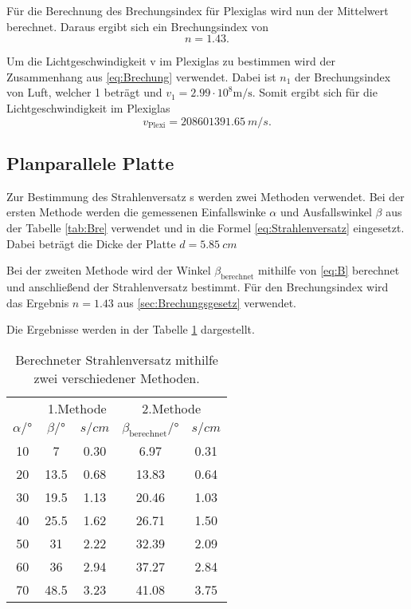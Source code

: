 \noindent Für die Berechnung des Brechungsindex für Plexiglas wird nun der Mittelwert berechnet.
Daraus ergibt sich ein Brechungsindex von
\begin{equation*}
  n = 1.43.
\end{equation*} 

\noindent Um die Lichtgeschwindigkeit v im Plexiglas zu bestimmen wird der Zusammenhang aus \ref{eq:Brechung} verwendet.
Dabei ist $n_1$ der Brechungsindex von Luft, welcher  1 beträgt und $v_1 = 2.99 \cdot 10^8 \si{\meter\per\second}$.
Somit ergibt sich für die Lichtgeschwindigkeit im Plexiglas 
\begin{equation*}
  v_\text{Plexi} = \qty{208601391.65}{m/s} .
\end{equation*}

\subsection{Planparallele Platte}
Zur Bestimmung des Strahlenversatz s werden zwei Methoden verwendet.
Bei der ersten Methode werden die gemessenen Einfallswinke $\alpha$ und Ausfallswinkel $\beta$ aus der Tabelle \ref{tab:Bre} verwendet und 
in die Formel \ref{eq:Strahlenversatz} eingesetzt.
Dabei beträgt die Dicke der Platte $d = \qty{5.85}{cm}$

\noindent Bei der zweiten Methode wird der Winkel $\beta_\text{berechnet}$ mithilfe von \ref{eq:B} berechnet und anschließend der Strahlenversatz bestimmt.
Für den Brechungsindex wird das Ergebnis $n = 1.43$ aus \ref{sec:Brechungsgesetz} verwendet.

\noindent Die Ergebnisse werden in der Tabelle \ref{tab:Plan} dargestellt.
\begin{table}[H]
  \centering
  \caption{Berechneter Strahlenversatz mithilfe zwei verschiedener Methoden.}
  \label{tab:Plan}
  \begin{tabular}{c c c c c}
    \toprule
  & \multicolumn{2}{c}{1.Methode} & \multicolumn{2}{c}{2.Methode} \\
\cmidrule(lr){2-3}\cmidrule(lr){4-5}
    $\alpha / °$ & $\beta  /° $ & $s /cm$ &  $\beta_\text{berechnet}  /°$ & $s /cm$ \\
    \midrule
    10 & 7    & 0.30 & 6.97 & 0.31\\  
    20 & 13.5 & 0.68 & 13.83 & 0.64\\    
    30 & 19.5 & 1.13 & 20.46 & 1.03\\  
    40 & 25.5 & 1.62 & 26.71 & 1.50\\  
    50 & 31   & 2.22 & 32.39 & 2.09\\  
    60 & 36   & 2.94 & 37.27 & 2.84\\  
    70 & 48.5 & 3.23 & 41.08 & 3.75\\  
    \bottomrule
  \end{tabular}
\end{table}

